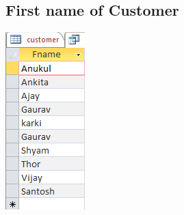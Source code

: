 \documentclass[17pt,a4paper,oneside,margin=1in]{article}
\begin{document}
\subsection{First name of Customer}
\includegraphics[width=\textwidth]{./scrot/q2-1.png}
\end{document}
